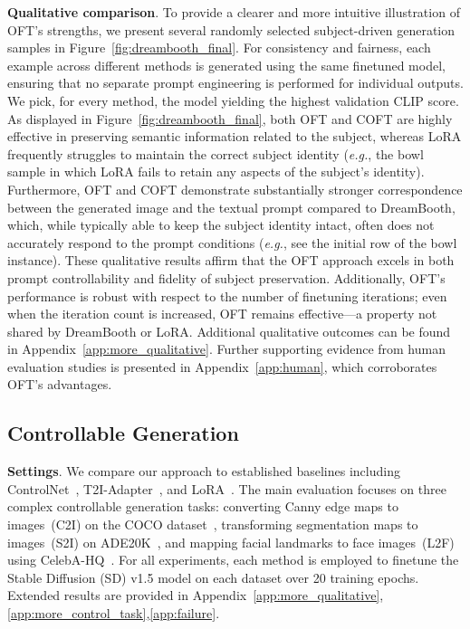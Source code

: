 \textbf{Qualitative comparison}. To provide a clearer and more intuitive illustration of OFT's strengths, we present several randomly selected subject-driven generation samples in Figure~\ref{fig:dreambooth_final}. For consistency and fairness, each example across different methods is generated using the same finetuned model, ensuring that no separate prompt engineering is performed for individual outputs. We pick, for every method, the model yielding the highest validation CLIP score. As displayed in Figure~\ref{fig:dreambooth_final}, both OFT and COFT are highly effective in preserving semantic information related to the subject, whereas LoRA frequently struggles to maintain the correct subject identity (\emph{e.g.}, the bowl sample in which LoRA fails to retain any aspects of the subject's identity). Furthermore, OFT and COFT demonstrate substantially stronger correspondence between the generated image and the textual prompt compared to DreamBooth, which, while typically able to keep the subject identity intact, often does not accurately respond to the prompt conditions (\emph{e.g.}, see the initial row of the bowl instance). These qualitative results affirm that the OFT approach excels in both prompt controllability and fidelity of subject preservation. Additionally, OFT's performance is robust with respect to the number of finetuning iterations; even when the iteration count is increased, OFT remains effective—a property not shared by DreamBooth or LoRA. Additional qualitative outcomes can be found in Appendix~\ref{app:more_qualitative}. Further supporting evidence from human evaluation studies is presented in Appendix~\ref{app:human}, which corroborates OFT’s advantages.

\subsection{Controllable Generation}

\textbf{Settings}. We compare our approach to established baselines including ControlNet~\cite{zhang2023adding}, T2I-Adapter~\cite{mou2023t2i}, and LoRA~\cite{hulora2022}. The main evaluation focuses on three complex controllable generation tasks: converting Canny edge maps to images~(C2I) on the COCO dataset~\cite{lin2014microsoft}, transforming segmentation maps to images~(S2I) on ADE20K~\cite{zhou2017scene}, and mapping facial landmarks to face images~(L2F) using CelebA-HQ~\cite{karras2018progressive,xia2021tedigan}. For all experiments, each method is employed to finetune the Stable Diffusion (SD) v1.5 model on each dataset over 20 training epochs. Extended results are provided in Appendix~\ref{app:more_qualitative},\ref{app:more_control_task},\ref{app:failure}.

